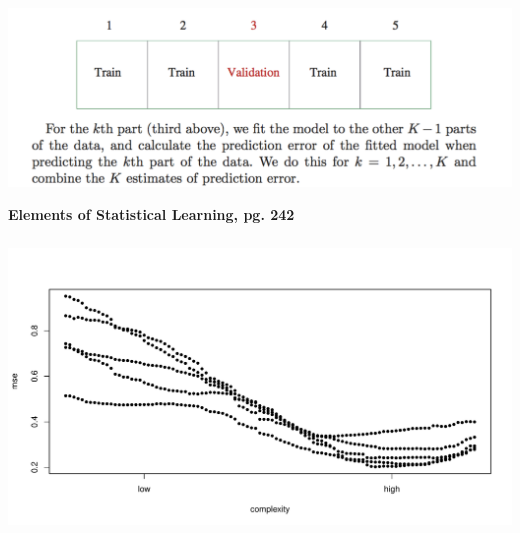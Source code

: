 \documentclass[xetex,mathserif,serif,aspectratio=169]{beamer}
\begin{document}
\begin{frame}[fragile] \frametitle{} \oldB \small

\begin{center}
\includegraphics[width=\textwidth]{img/pg242.pdf}
\end{center}

{\small \textbf{Elements of Statistical Learning, pg. 242}}

\end{frame}

\begin{frame}[fragile] \frametitle{} \oldB \small

\begin{center}
\includegraphics[width=\textwidth]{img/cv1.pdf}
\end{center}

\end{frame}
\end{document}
